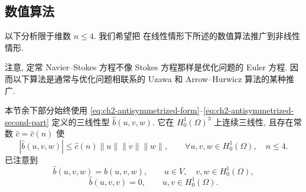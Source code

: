 \hypertarget{chapter-02-page-162}{}
\subsection{数值算法}
\label{subsec:ch2-stationary-numerical-algorithms}

以下分析限于维数 $n\leq4$. 我们希望把  在线性情形下所述的数值算法推广到非线性情形.

注意, 定常 Navier--Stokes 方程不像 Stokes 方程那样是优化问题的 Euler 方程. 因而以下算法是通常与优化问题相联系的 Uzawa 和 Arrow--Hurwicz 算法的某种推广.

本节余下部分始终使用 \eqref{eq:ch2-antisymmetrized-form}--\eqref{eq:ch2-antisymmetrized-second-part} 定义的三线性型 $\widehat b(u,v,w)$. 它在 $H_0^1(\Omega)^3$ 上连续三线性, 且存在常数 $\widehat c=\widehat c(n)$ 使
\begin{equation}
|\widehat b(u,v,w)|
\leq\widehat c(n)\lVert u\rVert\lVert v\rVert\lVert w\rVert,
\qquad\forall u,v,w\in H_0^1(\Omega),\quad n\leq4.
\label{eq:ch2-algorithms-trilinear-continuity}
\end{equation}
已注意到
\begin{equation}
\widehat b(u,v,w)=b(u,v,w),
\qquad u\in V,\quad v,w\in H_0^1(\Omega),
\label{eq:ch2-algorithms-trilinear-agreement}
\end{equation}
\begin{equation}
\widehat b(u,v,v)=0,
\qquad u,v\in H_0^1(\Omega).
\label{eq:ch2-algorithms-trilinear-zero}
\end{equation}

